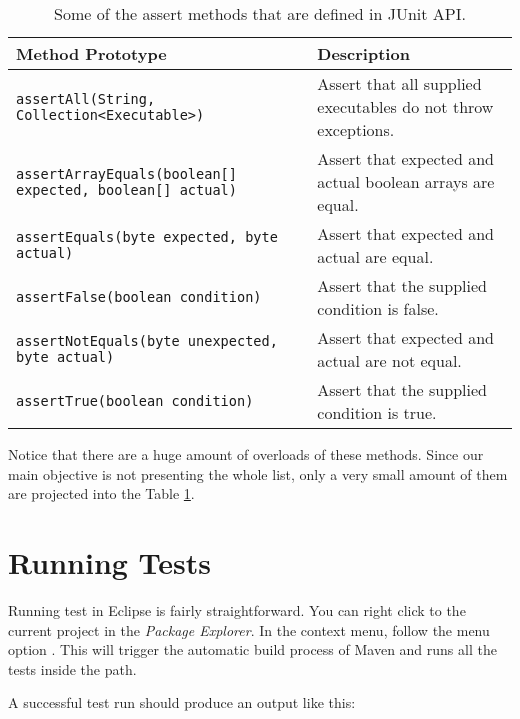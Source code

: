 \begin{table}[H]
    \centering
    \renewcommand{\arraystretch}{1.2}
    \caption{Some of the assert methods that are defined in JUnit API.}
    \label{tab:junit-asserts}
    \begin{adjustbox}{max width=\textwidth}
        \begin{tabular}{ll}
            \toprule
            Method Prototype & Description \\
            \midrule
            \lstinline!assertAll(String, Collection<Executable>)! & Assert that all supplied executables do not throw exceptions.\\
            \lstinline!assertArrayEquals(boolean[] expected, boolean[] actual)! & Assert that expected and actual boolean arrays are equal.\\
            \lstinline!assertEquals(byte expected, byte actual)! & Assert that expected and actual are equal.\\
            \lstinline!assertFalse(boolean condition)! & Assert that the supplied condition is false.\\
            \lstinline!assertNotEquals(byte unexpected, byte actual)! & Assert that expected and actual are not equal.\\
            \lstinline!assertTrue(boolean condition)! & Assert that the supplied condition is true.\\
            \bottomrule
        \end{tabular}
    \end{adjustbox}
\end{table}

Notice that there are a huge amount of overloads of these methods. Since our main objective is not presenting the whole list, only a very small amount of them are projected into the Table \ref{tab:junit-asserts}.

\section{Running Tests}
Running test in Eclipse is fairly straightforward. You can right click to the current project in the \emph{Package Explorer}. In the context menu, follow the menu option . This will trigger the automatic build process of Maven and runs all the tests inside the  path.

A successful test run should produce an output like this:

